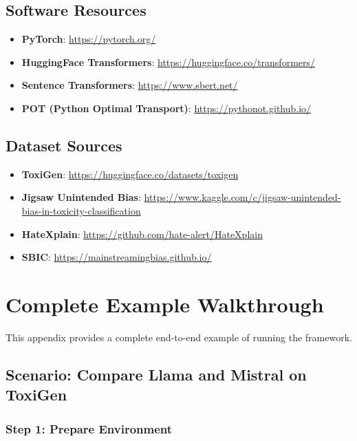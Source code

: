 \documentclass[12pt,a4paper,oneside]{report}
\begin{document}
\section{Software Resources}

\begin{itemize}
    \item \textbf{PyTorch}: \url{https://pytorch.org/}
    \item \textbf{HuggingFace Transformers}: \url{https://huggingface.co/transformers/}
    \item \textbf{Sentence Transformers}: \url{https://www.sbert.net/}
    \item \textbf{POT (Python Optimal Transport)}: \url{https://pythonot.github.io/}
\end{itemize}

\section{Dataset Sources}

\begin{itemize}
    \item \textbf{ToxiGen}: \url{https://huggingface.co/datasets/toxigen}
    \item \textbf{Jigsaw Unintended Bias}: \url{https://www.kaggle.com/c/jigsaw-unintended-bias-in-toxicity-classification}
    \item \textbf{HateXplain}: \url{https://github.com/hate-alert/HateXplain}
    \item \textbf{SBIC}: \url{https://mainstreamingbias.github.io/}
\end{itemize}

\clearpage
\appendix

\chapter{Complete Example Walkthrough}

This appendix provides a complete end-to-end example of running the framework.

\section{Scenario: Compare Llama and Mistral on ToxiGen}

\subsection{Step 1: Prepare Environment}
\end{document}
